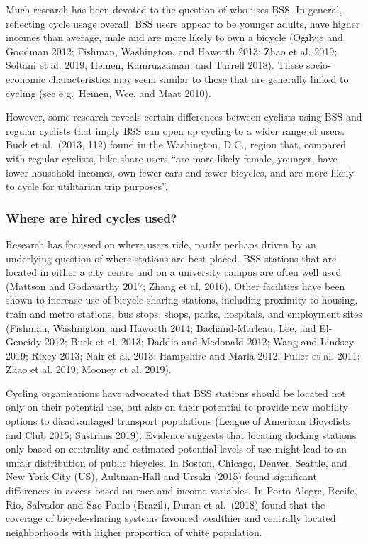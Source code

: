\documentclass[
]{article}
\begin{document}
Much research has been devoted to the question of who uses BSS.
In general, reflecting cycle usage overall, BSS users appear to be younger adults, have higher incomes than average, male and are more likely to own a bicycle (Ogilvie and Goodman 2012; Fishman, Washington, and Haworth 2013; Zhao et al. 2019; Soltani et al. 2019; Heinen, Kamruzzaman, and Turrell 2018).
These socio-economic characteristics may seem similar to those that are generally linked to cycling (see e.g.~Heinen, Wee, and Maat 2010).

However, some research reveals certain differences between cyclists using BSS and regular cyclists that imply BSS can open up cycling to a wider range of users.
Buck et al.~(2013, 112) found in the Washington, D.C., region that, compared with regular cyclists, bike-share users ``are more likely female, younger, have lower household incomes, own fewer cars and fewer bicycles, and are more likely to cycle for utilitarian trip purposes''.

\hypertarget{where-are-hired-cycles-used}{%
\subsubsection{Where are hired cycles used?}\label{where-are-hired-cycles-used}}

Research has focussed on where users ride, partly perhaps driven by an underlying question of where stations are best placed. BSS stations that are located in either a city centre and on a university campus are often well used (Mattson and Godavarthy 2017; Zhang et al. 2016).
Other facilities have been shown to increase use of bicycle sharing stations, including proximity to housing, train and metro stations, bus stops, shops, parks, hospitals, and employment sites (Fishman, Washington, and Haworth 2014; Bachand-Marleau, Lee, and El-Geneidy 2012; Buck et al. 2013; Daddio and Mcdonald 2012; Wang and Lindsey 2019; Rixey 2013; Nair et al. 2013; Hampshire and Marla 2012; Fuller et al. 2011; Zhao et al. 2019; Mooney et al. 2019).

Cycling organisations have advocated that BSS stations should be located not only on their potential use, but also on their potential to provide new mobility options to disadvantaged transport populations (League of American Bicyclists and Club 2015; Sustrans 2019).
Evidence suggests that locating docking stations only based on centrality and estimated potential levels of use might lead to an unfair distribution of public bicycles.
In Boston, Chicago, Denver, Seattle, and New York City (US), Aultman-Hall and Ursaki (2015) found significant differences in access based on race and income variables.
In Porto Alegre, Recife, Rio, Salvador and Sao Paulo (Brazil), Duran et al.~(2018) found that the coverage of bicycle-sharing systems favoured wealthier and centrally located neighborhoods with higher proportion of white population.
\end{document}

